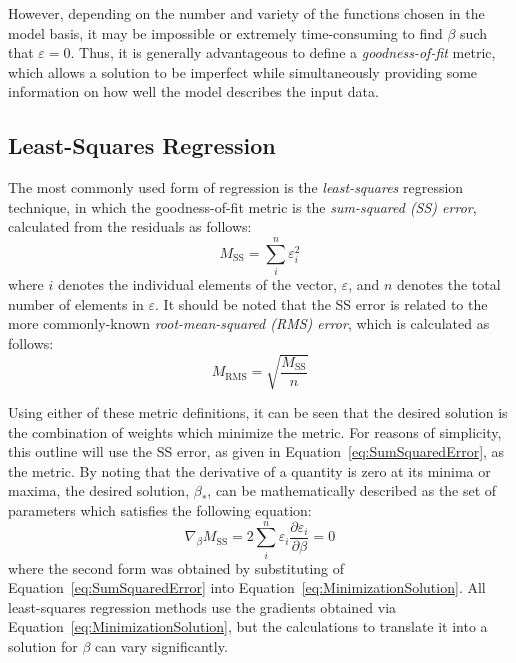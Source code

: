\documentclass{article}
\begin{document}
However, depending on the number and variety of the functions chosen in the model basis, it may be impossible or extremely time-consuming to find $\beta$ such that $\varepsilon=0$. Thus, it is generally advantageous to define a \emph{goodness-of-fit} metric, which allows a solution to be imperfect while simultaneously providing some information on how well the model describes the input data.

\subsection{Least-Squares Regression}
\label{subsec:LeastSquaresRegression}

The most commonly used form of regression is the \emph{least-squares} regression technique, in which the goodness-of-fit metric is the \emph{sum-squared (SS) error}, calculated from the residuals as follows:
\begin{equation}
\label{eq:SumSquaredError}
	M_{\text{SS}} = \sum_{i}^{n} \varepsilon_i^2
\end{equation}
where $i$ denotes the individual elements of the vector, $\varepsilon$, and $n$ denotes the total number of elements in $\varepsilon$. It should be noted that the SS error is related to the more commonly-known \emph{root-mean-squared (RMS) error}, which is calculated as follows:
\begin{equation}
\label{eq:RootMeanSquareError}
	M_{\text{RMS}} = \sqrt{\frac{M_{\text{SS}}}{n}}
\end{equation}

Using either of these metric definitions, it can be seen that the desired solution is the combination of weights which minimize the metric. For reasons of simplicity, this outline will use the SS error, as given in Equation~\eqref{eq:SumSquaredError}, as the metric. By noting that the derivative of a quantity is zero at its minima or maxima, the desired solution, $\beta_*$, can be mathematically described as the set of parameters which satisfies the following equation:
\begin{equation}
\label{eq:MinimizationSolution}
	\nabla_\beta M_{\text{SS}} = 2 \sum_{i}^{n} \varepsilon_i \frac{\partial \varepsilon_i}{\partial \beta} = 0
\end{equation}
where the second form was obtained by substituting of Equation~\eqref{eq:SumSquaredError} into Equation~\eqref{eq:MinimizationSolution}. All least-squares regression methods use the gradients obtained via Equation~\eqref{eq:MinimizationSolution}, but the calculations to translate it into a solution for $\beta$ can vary significantly.
\end{document}
